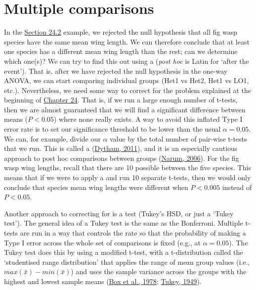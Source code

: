 \documentclass[
  openany]{krantz}
\begin{document}
\hypertarget{Chapter_25}{%
\chapter{Multiple comparisons}\label{Chapter_25}}

In the \protect\hyperlink{one-way-anova}{Section 24.2}  example, we rejected the null hypothesis that all fig wasp species have the same mean wing length.
We can therefore conclude that at least one species has a different mean wing length than the rest; can we determine which one(s)?
We can try to find this out using a  (\emph{post hoc} is Latin for `after the event').
That is, after we have rejected the null hypothesis in the one-way ANOVA, we can start comparing individual groups (Het1 vs Het2, Het1 vs LO1, etc.).
Nevertheless, we need some way to correct for the  problem explained at the beginning of \protect\hyperlink{Chapter_24}{Chapter 24}.
That is, if we run a large enough number of t-tests, then we are almost guaranteed that we will find a significant difference between means (\(P < 0.05\)) where none really exists.
A way to avoid this inflated Type I error rate is to set our significance threshold to be lower than the usual \(\alpha = 0.05\).
We can, for example, divide our \(\alpha\) value by the total number of pair-wise t-tests that we run.
This is called a  (\protect\hyperlink{ref-Dytham2011}{Dytham, 2011}), and it is an especially cautious approach to post hoc comparisons between groups (\protect\hyperlink{ref-Narum2006}{Narum, 2006}).
For the fig wasp wing lengths, recall that there are 10 possible  between the five species.
This means that if we were to apply a  and run 10 separate t-tests, then we would only conclude that species mean wing lengths were different when \(P < 0.005\) instead of \(P < 0.05\).

Another approach to correcting for  is a  test (Tukey's HSD, or just a `Tukey test').
The general idea of a Tukey test is the same as the Bonferroni.
Multiple t-tests are run in a way that controls the  rate so that the probability of making a Type I error across the whole set of comparisons is fixed (e.g., at \(\alpha = 0.05\)).
The Tukey test does this by using a modified t-test, with a t-distribution called the `studentised range distribution' that applies the range of mean group values (i.e., \(max(\bar{x}) - min(\bar{x})\)) and uses the sample variance across the groups with the highest and lowest sample means (\protect\hyperlink{ref-Box1978}{Box et al., 1978}; \protect\hyperlink{ref-Tukey1949}{Tukey, 1949}).
\end{document}
